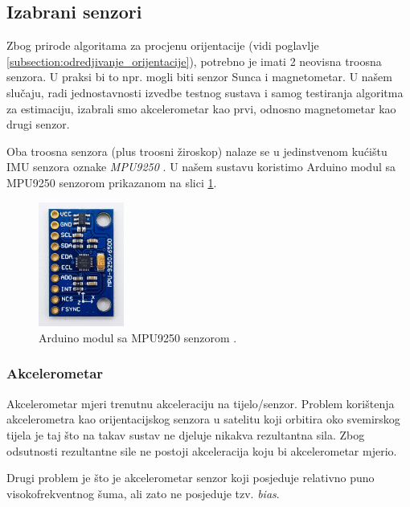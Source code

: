 \documentclass[times, utf8, diplomski, numeric]{templates/template}
\begin{document}
{{        \subsection{Izabrani senzori}{
            Zbog prirode algoritama za procjenu orijentacije (vidi poglavlje \ref{subsection:odredjivanje_orijentacije}), potrebno je imati 2 neovisna troosna senzora. U praksi bi to npr. mogli biti senzor Sunca i magnetometar. U našem slučaju, radi jednostavnosti izvedbe testnog sustava i samog testiranja algoritma za estimaciju, izabrali smo akcelerometar kao prvi, odnosno magnetometar kao drugi senzor. 

            Oba troosna senzora (plus troosni žiroskop) nalaze se u jedinstvenom kućištu IMU senzora oznake \emph{MPU9250} \cite{mpu9250_datasheet}. U našem sustavu koristimo Arduino modul sa MPU9250 senzorom prikazanom na slici \ref{fig:mpu9250}.

            \begin{figure}[htb]
            \centering
            \includegraphics[width=0.25\textwidth]{images/mpu9250.jpg}
            \caption{Arduino modul sa MPU9250 senzorom \cite{wolles_mpu9250}.}
            \label{fig:mpu9250}
            \end{figure}

            \subsubsection{Akcelerometar}{
                Akcelerometar mjeri trenutnu akceleraciju na tijelo/senzor. Problem korištenja akcelerometra kao orijentacijskog senzora u satelitu koji orbitira oko svemirskog tijela je taj što na takav sustav ne djeluje nikakva rezultantna sila. Zbog odsutnosti rezultantne sile ne postoji akceleracija koju bi akcelerometar mjerio. 

                Drugi problem je što je akcelerometar senzor koji posjeduje relativno puno visokofrekventnog šuma, ali zato ne posjeduje tzv. \emph{bias}. 
            }

}}}
\end{document}
